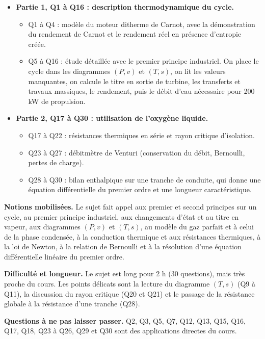 \documentclass[11pt,a4paper]{article}
\providecommand{\tightlist}{\setlength{\itemsep}{0pt}\setlength{\parskip}{0pt}}
\begin{document}
\begin{itemize}
\tightlist
\item
  \textbf{Partie 1, Q1 à Q16 : description thermodynamique du cycle.}

  \begin{itemize}
  \tightlist
  \item
    Q1 à Q4 : modèle du moteur ditherme de Carnot, avec la démonstration du rendement de Carnot et le rendement réel en présence d'entropie créée.
  \item
    Q5 à Q16 : étude détaillée avec le premier principe industriel. On place le cycle dans les diagrammes \((P,v)\) et \((T,s)\), on lit les valeurs manquantes, on calcule le titre en sortie de turbine, les transferts et travaux massiques, le rendement, puis le débit d'eau nécessaire pour 200 kW de propulsion.
  \end{itemize}
\item
  \textbf{Partie 2, Q17 à Q30 : utilisation de l'oxygène liquide.}

  \begin{itemize}
  \tightlist
  \item
    Q17 à Q22 : résistances thermiques en série et rayon critique d'isolation.
  \item
    Q23 à Q27 : débitmètre de Venturi (conservation du débit, Bernoulli, pertes de charge).
  \item
    Q28 à Q30 : bilan enthalpique sur une tranche de conduite, qui donne une équation différentielle du premier ordre et une longueur caractéristique.
  \end{itemize}
\end{itemize}

\textbf{Notions mobilisées.} Le sujet fait appel aux premier et second principes sur un cycle, au premier principe industriel, aux changements d'état et au titre en vapeur, aux diagrammes \((P,v)\) et \((T,s)\), au modèle du gaz parfait et à celui de la phase condensée, à la conduction thermique et aux résistances thermiques, à la loi de Newton, à la relation de Bernoulli et à la résolution d'une équation différentielle linéaire du premier ordre.

\textbf{Difficulté et longueur.} Le sujet est long pour 2 h (30 questions), mais très proche du cours. Les points délicats sont la lecture du diagramme \((T,s)\) (Q9 à Q11), la discussion du rayon critique (Q20 et Q21) et le passage de la résistance globale à la résistance d'une tranche (Q28).

\textbf{Questions à ne pas laisser passer.} Q2, Q3, Q5, Q7, Q12, Q13, Q15, Q16, Q17, Q18, Q23 à Q26, Q29 et Q30 sont des applications directes du cours.
\end{document}
